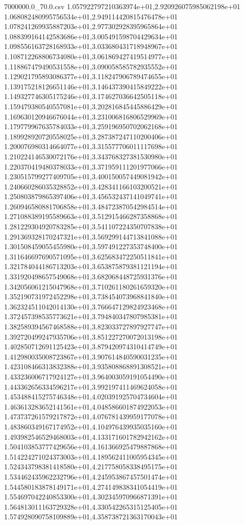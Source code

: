 \begin{filecontents*}{7000000.0_70.0.csv}
1.057922797210363974e+01,2.920926075985062198e+01
1.068082480995756534e+01,2.949114420815476478e+01
1.078241269935887203e+01,2.977302928395965864e+01
1.088399164142583686e+01,3.005491598704429634e+01
1.098556163728168933e+01,3.033680431718948967e+01
1.108712268806734080e+01,3.061869427419514977e+01
1.118867479490531558e+01,3.090058585782935552e+01
1.129021795893086377e+01,3.118247906789474655e+01
1.139175218126651146e+01,3.146437390415849222e+01
1.149327746305175246e+01,3.174627036642505118e+01
1.159479380540557081e+01,3.202816845445886429e+01
1.169630120946676044e+01,3.231006816806529969e+01
1.179779967635784033e+01,3.259196950702062168e+01
1.189928920720558025e+01,3.287387247110200406e+01
1.200076980314664077e+01,3.315577706011117698e+01
1.210224146530072176e+01,3.343768327381530980e+01
1.220370419480378033e+01,3.371959111201977066e+01
1.230515799277409705e+01,3.400150057449081942e+01
1.240660286035328852e+01,3.428341166103200521e+01
1.250803879865397406e+01,3.456532437141049741e+01
1.260946580881706858e+01,3.484723870542984514e+01
1.271088389195589663e+01,3.512915466287358868e+01
1.281229304920783285e+01,3.541107224350707838e+01
1.291369328170247321e+01,3.569299144713841088e+01
1.301508459055455980e+01,3.597491227353748400e+01
1.311646697690571095e+01,3.625683472250511841e+01
1.321784044186713203e+01,3.653875879381121194e+01
1.331920498657549068e+01,3.682068448725931376e+01
1.342056061215047968e+01,3.710261180261659320e+01
1.352190731972452298e+01,3.738454073968841840e+01
1.362324511042014130e+01,3.766647129824923468e+01
1.372457398535773621e+01,3.794840347807985381e+01
1.382589394567468588e+01,3.823033727897927747e+01
1.392720499247935706e+01,3.851227270072013198e+01
1.402850712691125423e+01,3.879420974310414749e+01
1.412980035008723867e+01,3.907614840590031235e+01
1.423108466313832388e+01,3.935808868891308521e+01
1.433236006717924127e+01,3.964003059191054490e+01
1.443362656334596217e+01,3.992197411469624058e+01
1.453488415275746348e+01,4.020391925704734604e+01
1.463613283652141561e+01,4.048586601874922053e+01
1.473737261579217872e+01,4.076781439959177078e+01
1.483860349167174952e+01,4.104976439935035160e+01
1.493982546529468003e+01,4.133171601782942162e+01
1.504103853777429656e+01,4.161366925479887868e+01
1.514224271024373003e+01,4.189562411005954345e+01
1.524343798381418580e+01,4.217758058338495175e+01
1.534462435962232796e+01,4.245953867457501474e+01
1.544580183878149171e+01,4.274149838341054419e+01
1.554697042240853300e+01,4.302345970966871391e+01
1.564813011163729328e+01,4.330542265315125405e+01
1.574928090758109889e+01,4.358738721363170043e+01

\end{filecontents*}
